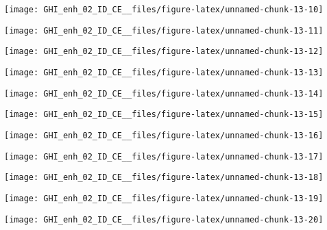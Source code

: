 \documentclass[
  10pt,
  a4paper,oneside]{article}
\begin{document}
\begin{center}\texttt{[image: GHI\_enh\_02\_ID\_CE\_\_files/figure-latex/unnamed-chunk-13-10]} \end{center}

\begin{center}\texttt{[image: GHI\_enh\_02\_ID\_CE\_\_files/figure-latex/unnamed-chunk-13-11]} \end{center}

\begin{center}\texttt{[image: GHI\_enh\_02\_ID\_CE\_\_files/figure-latex/unnamed-chunk-13-12]} \end{center}

\begin{center}\texttt{[image: GHI\_enh\_02\_ID\_CE\_\_files/figure-latex/unnamed-chunk-13-13]} \end{center}

\begin{center}\texttt{[image: GHI\_enh\_02\_ID\_CE\_\_files/figure-latex/unnamed-chunk-13-14]} \end{center}

\begin{center}\texttt{[image: GHI\_enh\_02\_ID\_CE\_\_files/figure-latex/unnamed-chunk-13-15]} \end{center}

\begin{center}\texttt{[image: GHI\_enh\_02\_ID\_CE\_\_files/figure-latex/unnamed-chunk-13-16]} \end{center}

\begin{center}\texttt{[image: GHI\_enh\_02\_ID\_CE\_\_files/figure-latex/unnamed-chunk-13-17]} \end{center}

\begin{center}\texttt{[image: GHI\_enh\_02\_ID\_CE\_\_files/figure-latex/unnamed-chunk-13-18]} \end{center}

\begin{center}\texttt{[image: GHI\_enh\_02\_ID\_CE\_\_files/figure-latex/unnamed-chunk-13-19]} \end{center}

\begin{center}\texttt{[image: GHI\_enh\_02\_ID\_CE\_\_files/figure-latex/unnamed-chunk-13-20]} \end{center}
\end{document}
